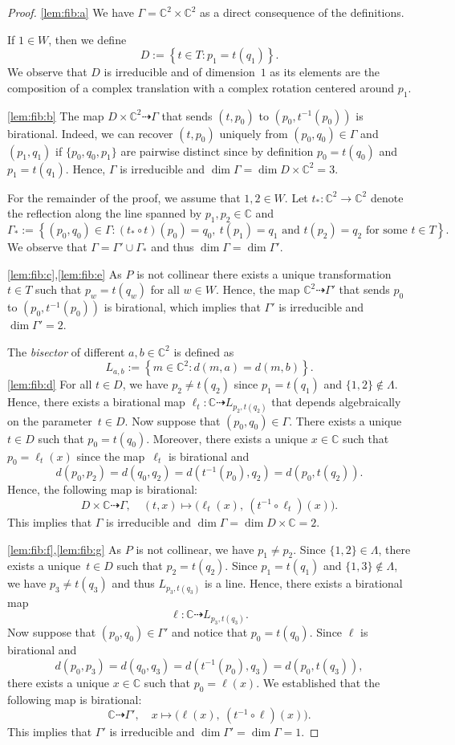 \documentclass[12pt]{article}
\theoremstyle{definition}
\newcommand{\df}[1]{{\it #1}}
\newcommand{\st}{such that }
\renewcommand{\c}{\colon}
\newcommand{\set}[2]{\left\{#1:#2\right\}}
\newcommand{\dto}{\dasharrow}
\newcommand{\C}{{\mathbb{C}}}
\newcommand{\sd}{d} %
\begin{document}
\begin{proof}
\ref{lem:fib:a} We have $\Gamma=\C^2\times\C^2$ as a direct consequence of the definitions.

If $1\in W$, then we define
\[
D:=\set{t\in T}{p_1=t(q_1)}.
\]
We observe that $D$ is irreducible and of dimension~$1$ as its elements
are the composition of a complex translation with a complex
rotation centered around $p_1$.

\ref{lem:fib:b} The map $D\times\C^2\dto \Gamma$ that sends $(t,p_0)$ to $(p_0,t^{-1}(p_0))$
is birational.
Indeed, we can recover $(t,p_0)$ uniquely from $(p_0,q_0)\in \Gamma$ and $(p_1,q_1)$
if $\{p_0,q_0,p_1\}$ are pairwise distinct since by definition $p_0=t(q_0)$ and $p_1=t(q_1)$.
Hence, $\Gamma$ is irreducible and $\dim \Gamma=\dim D\times\C^2=3$.

For the remainder of the proof, we assume that $1,2\in W$.
Let
$t_*\c\C^2\to \C^2$ denote the reflection along the line spanned by $p_1,p_2\in\C$
and
\[
\Gamma_*:=\set{(p_0,q_0)\in \Gamma}{(t_*\circ t)(p_0)=q_0,~ t(p_1)=q_1 \text{ and } t(p_2)=q_2 \text{ for some }t\in T}.
\]
We observe that $\Gamma=\Gamma'\cup\Gamma_*$ and thus $\dim\Gamma=\dim \Gamma'$.

\ref{lem:fib:c},\ref{lem:fib:e}
As $P$ is not collinear there exists a unique transformation~$t\in T$ \st
$p_w=t(q_w)$ for all $w\in W$.
Hence, the map $\C^2\dto \Gamma'$ that sends $p_0$ to $(p_0,t^{-1}(p_0))$
is birational, which implies that $\Gamma'$ is irreducible and $\dim\Gamma'=2$.

The \df{bisector} of different $a,b\in\C^2$ is defined as
\[
L_{a,b}:=\set{m\in\C^2}{\sd(m,a)=\sd(m,b)}.
\]
\ref{lem:fib:d}
For all $t\in D$, we have $p_2\neq t(q_2)$ since $p_1=t(q_1)$
and $\{1,2\}\notin \Lambda$.
Hence, there exists a birational map $\ell_t\c \C\dto L_{p_2,t(q_2)}$
that depends algebraically on the parameter~$t\in D$.
Now suppose that $(p_0,q_0)\in\Gamma$.
There exists a unique $t\in D$ \st $p_0=t(q_0)$.
Moreover, there exists a unique $x\in \C$ \st $p_0=\ell_t(x)$ since
the map~$\ell_t$ is birational and
\[
\sd(p_0,p_2)=\sd(q_0,q_2)=\sd(t^{-1}(p_0),q_2)=\sd(p_0,t(q_2)).
\]
Hence, the following map is birational:
\[
D\times\C \dto \Gamma, \quad (t,x)\mapsto \bigl(\ell_t(x),~(t^{-1}\circ\ell_t)(x)\bigr).
\]
This implies that $\Gamma$ is irreducible and $\dim\Gamma=\dim D\times\C=2$.

\ref{lem:fib:f},\ref{lem:fib:g}
As $P$ is not collinear, we have $p_1\neq p_2$.
Since $\{1,2\}\in\Lambda$,
there exists a unique~$t\in D$ \st $p_2=t(q_2)$.
Since $p_1=t(q_1)$ and $\{1,3\}\notin \Lambda$,
we have $p_3\neq t(q_3)$ and thus $L_{p_3,t(q_3)}$ is a line.
Hence, there exists a birational map
\[
\ell\c \C\dto L_{p_3,t(q_3)}.
\]
Now suppose that $(p_0,q_0)\in\Gamma'$ and notice that $p_0=t(q_0)$.
Since $\ell$ is birational and
\[
\sd(p_0,p_3)=\sd(q_0,q_3)=\sd(t^{-1}(p_0),q_3)=\sd(p_0,t(q_3)),
\]
there exists a unique $x\in \C$ \st $p_0=\ell(x)$.
We established that the following map is birational:
\[
\C \dto \Gamma', \quad x\mapsto \bigl(\ell(x),~(t^{-1}\circ\ell)(x)\bigr).
\]
This implies that $\Gamma'$ is irreducible and
$\dim\Gamma'=\dim\Gamma=1$.


\end{proof}
\end{document}
